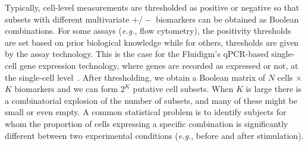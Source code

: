 \documentclass[12pt,oupdraft]{biostatistics}
\begin{document}

Typically, cell-level measurements are thresholded as positive or negative so that subsets with different multivariate $+/-$ biomarkers can be obtained as Boolean combinations.
For some assays (\textit{e.g.}, flow cytometry), the positivity thresholds are set based on prior biological knowledge while for others, thresholds are given by the assay technology.
This is the case for the Fluidigm's qPCR-based single-cell gene expression technology, where genes are recorded as expressed or not, at the single-cell level~\citep{McDavid2012}.
 After thresholding, we obtain a Boolean matrix of $N$ cells $\times$ $K$ biomarkers and we can form $2^K$ putative cell subsets.
When $K$ is large there is a combinatorial explosion of the number of subsets, and many of these might be small or even empty.
A common statistical problem is to identify subjects for whom the proportion of cells expressing a specific combination is significantly different between two experimental conditions (\textit{e.g.}, before and after stimulation). 
\end{document}
